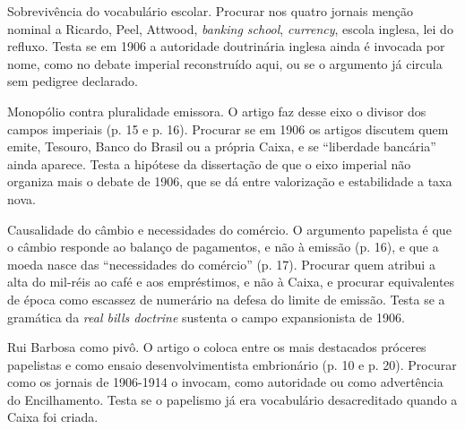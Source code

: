 \begin{dialogo}
\item Sobrevivência do vocabulário escolar. Procurar nos quatro jornais menção
nominal a Ricardo, Peel, Attwood, \emph{banking school}, \emph{currency},
escola inglesa, lei do refluxo. Testa se em 1906 a autoridade doutrinária
inglesa ainda é invocada por nome, como no debate imperial reconstruído aqui,
ou se o argumento já circula sem pedigree declarado.

\item Monopólio contra pluralidade emissora. O artigo faz desse eixo o divisor
dos campos imperiais (p. 15 e p. 16). Procurar se em 1906 os artigos discutem
quem emite, Tesouro, Banco do Brasil ou a própria Caixa, e se ``liberdade
bancária'' ainda aparece. Testa a hipótese da dissertação de que o eixo
imperial não organiza mais o debate de 1906, que se dá entre valorização e
estabilidade a taxa nova.

\item Causalidade do câmbio e necessidades do comércio. O argumento papelista
é que o câmbio responde ao balanço de pagamentos, e não à emissão (p. 16), e
que a moeda nasce das ``necessidades do comércio'' (p. 17). Procurar quem
atribui a alta do mil-réis ao café e aos empréstimos, e não à Caixa, e procurar
equivalentes de época como escassez de numerário na defesa do limite de
emissão. Testa se a gramática da \emph{real bills doctrine} sustenta o campo
expansionista de 1906.

\item Rui Barbosa como pivô. O artigo o coloca entre os mais destacados
próceres papelistas e como ensaio desenvolvimentista embrionário (p. 10 e p.
20). Procurar
como os jornais de 1906-1914 o invocam, como autoridade ou como advertência do
Encilhamento. Testa se o papelismo já era vocabulário desacreditado quando a
Caixa foi criada.
\end{dialogo}

